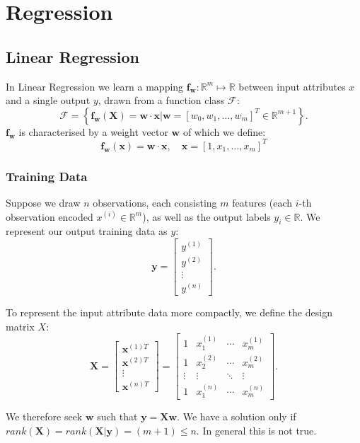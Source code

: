 \section{Regression}
\subsection{Linear Regression}
In Linear Regression we learn a mapping $\mathbf{f_w}:\mathbb{R}^{m}\mapsto
\mathbb{R}$ between input attributes $x$ and a single output $y$,
drawn from a function class $\mathcal{F}$:
\[\mathcal{F}=\left\{ \mathbf{f_w(X)=w\cdot x|w}={\left[ w_0,w_1,\ldots,w_m \right]}^{T}\in \mathbb{R}^{m+1} \right\}.\] 
$\mathbf{f_w}$ is characterised by a weight vector $\mathbf{w}$ of which we define:
\[\mathbf{f_w(x)=w\cdot x,\quad x}={[1,x_1,\ldots,x_m]}^{T}\]
\subsubsection{Training Data}
Suppose we draw $n$ observations, each consisting $m$ features (each $i$-th
observation encoded $x^{(i)}\in \mathbb{R}^{m}$), as well as the output labels
$y_i\in \mathbb{R}$. We represent our output training data as $y$:
\[\mathbf{y}=\begin{bmatrix} y^{(1)}\\y^{(2)}\\\vdots\\y^{(n)} \end{bmatrix}.\] 
\begin{definition}
  To represent the input attribute data more compactly, we define the design matrix $X$:
  \[\mathbf{X}=\begin{bmatrix}
    \mathbf{x}^{(1)T}\\\mathbf{x}^{(2)T}\\\vdots\\\mathbf{x}^{(n)T}
    \end{bmatrix} =\begin{bmatrix}
  1&x_1^{(1)}&\cdots&x_m^{(1)}\\
  1&x_2^{(2)}&\cdots&x_m^{(2)}\\
  \vdots&\vdots&\ddots&\vdots\\
  1&x_1^{(n)}&\cdots&x_m^{(n)}
\end{bmatrix}.\] 
\end{definition}
We therefore seek $\mathbf{w}$ such that $\mathbf{y=Xw}$. We have a solution
only if $rank(\mathbf{X})=rank(\mathbf{X|y})=(m+1)\le n$. In general this is
not true.

